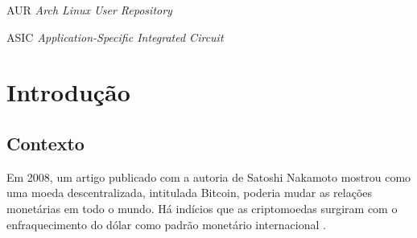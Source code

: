 \documentclass[
article,			%
12pt,				%
openright,			%
oneside,			%
a4paper,			%
chapter=TITLE,		%
section=TITLE,		%
subsection=TITLE,	%
subsubsection=TITLE,%
subsubsubsection=TITLE, %
english,			%
brazil,				%
]{abntex2}
\begin{document}

\listoffigures*
\cleardoublepage

\listoftables*
\cleardoublepage

\begin{siglas}
\item[AUR] \emph{Arch Linux User Repository} 
\item[ASIC] \emph{Application-Specific Integrated Circuit}
\end{siglas}

\tableofcontents*
\cleardoublepage


\textual

\section{Introdução}

\subsection{Contexto}

Em 2008, um artigo publicado com a autoria de Satoshi Nakamoto mostrou
como uma moeda descentralizada, intitulada Bitcoin, poderia mudar as
relações monetárias em todo o mundo. Há indícios que as criptomoedas
surgiram com o enfraquecimento do dólar como padrão monetário
internacional \cite{FAE2014}. 
\end{document}
